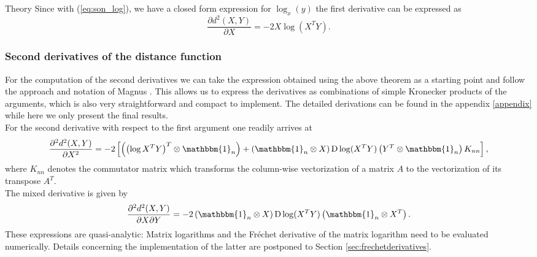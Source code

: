\begin{chapter}{Theory}
Since with (\ref{eq:son_log}), we have a closed form expression for $\log_x(y)$ the first derivative can be expressed as
\begin{equation}
    \frac{\partial d^2(X,Y)}{\partial X} = -2X\log(X^TY).
\end{equation}

\subsubsection{Second derivatives of the distance function} %
\label{ssub:SecondDerSO}
For the computation of the second derivatives we can take the expression obtained using the above theorem as a starting point and follow the approach and notation of Magnus \cite{Magnus}. 
This allows us to express the derivatives as combinations of simple Kronecker products of the arguments, which is also very straightforward and compact to implement. 
The detailed derivations can be found in the appendix \ref{appendix} while here we only present the final results. \\
For the second derivative with respect to the first argument one readily arrives at
\begin{equation}
    \label{eq:son_xx_der}
    \frac{\partial^2 d^2(X,Y)}{\partial X^2} = -2\left[\left(\left(\log X^TY\right)^T\otimes\mathbbm{1}_n\right) + \left(\mathbbm{1}_n\otimes X \right)\operatorname{D}\log(X^TY) \left(Y^T\otimes\mathbbm{1}_n \right) K_{nn}\right],
\end{equation}
where $K_{nn}$ denotes the commutator matrix which transforms the column-wise vectorization of a matrix $A$ to the vectorization of its transpose $A^T$.\\

The mixed derivative is given by
\begin{equation}
    \label{eq:son_xy_der}
    \frac{\partial^2 d^2(X,Y)}{\partial X\partial Y} = -2\left(\mathbbm{1}_n\otimes X \right)\operatorname{D}\log(X^TY) \left(\mathbbm{1}_n\otimes X^T \right).
\end{equation}
These expressions are quasi-analytic: Matrix logarithms and the Fr\'{e}chet derivative of the matrix logarithm need to be evaluated numerically. Details concerning the 
implementation of the latter are postponed to Section \ref{sec:frechetderivatives}.


\end{chapter}
